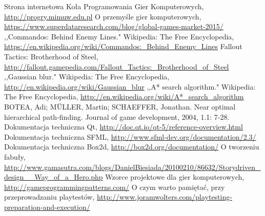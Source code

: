 \documentclass[licencjacka]{pracamgr}
\begin{document}
\begin{thebibliography}{99}
   Strona internetowa Koła Programowania Gier Komputerowych, \url{http://progry.mimuw.edu.pl}
   O przemyśle gier komputerowych, \url{https://www.superdataresearch.com/blog/global-games-market-2015/}
   ,,Commandos: Behind Enemy Lines." Wikipedia: The Free Encyclopedia, \url{https://en.wikipedia.org/wiki/Commandos:_Behind_Enemy_Lines}
   Fallout Tactics: Brotherhood of Steel, \url{http://fallout.gamepedia.com/Fallout_Tactics:_Brotherhood_of_Steel}
   ,,Gaussian blur." Wikipedia: The Free Encyclopedia, \url{http://en.wikipedia.org/wiki/Gaussian_blur}
   ,,A* search algorithm." Wikipedia: The Free Encyclopedia, \url{http://en.wikipedia.org/wiki/A*_search_algorithm}
   BOTEA, Adi; MÜLLER, Martin; SCHAEFFER, Jonathan. Near optimal hierarchical path-finding. Journal of game development, 2004, 1.1: 7-28.
   Dokumentacja techniczna Qt, \url{http://doc.qt.io/qt-5/reference-overview.html}
   Dokumentacja techniczna SFML, \url{http://www.sfml-dev.org/documentation/2.3/}
   Dokumentacja techniczna Box2d, \url{http://box2d.org/documentation/}
   O tworzeniu fabuły, \url{http://www.gamasutra.com/blogs/DanielBiesiada/20100210/86632/Storydriven_design__Way_of_a_Hero.php}
   Wzorce projektowe dla gier komputerowych, \url{http://gameprogrammingpatterns.com/}
   O czym warto pamiętać, przy przeprowadzaniu playtestów, \url{http://www.joramwolters.com/playtesting-preparation-and-execution/}
    
\end{thebibliography}
\end{document}
